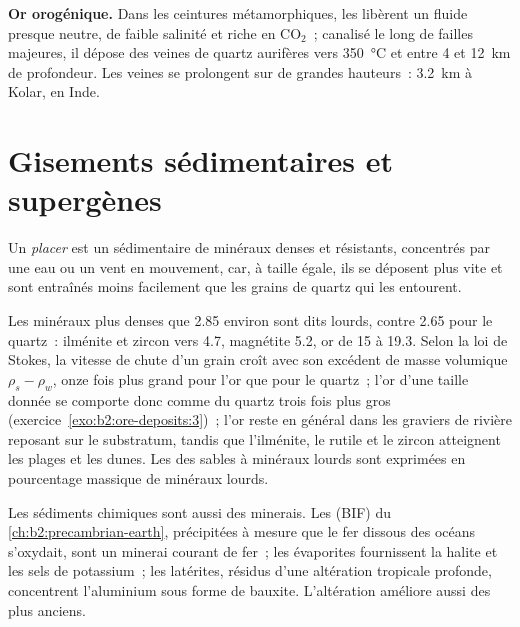 \textbf{Or orogénique.} Dans les ceintures métamorphiques, les  libèrent
un fluide presque neutre, de faible salinité et riche en CO$_2$~; canalisé le long de failles majeures,
il dépose des veines de quartz aurifères vers \qty{350}{\celsius} et entre 4 et \qty{12}{km}
de profondeur. Les veines se prolongent sur de grandes hauteurs~: \qty{3.2}{km} à Kolar, en Inde.

\section{Gisements sédimentaires et supergènes}\label{sec:b2:ore-deposits:sedimentary}

\begin{definition}[Placer]\label{def:b2:ore-deposits:placer}
Un \emph{placer} est un  sédimentaire de minéraux denses et résistants,
concentrés par une eau ou un vent en mouvement, car, à taille égale, ils se déposent
plus vite et sont entraînés moins facilement que les grains de quartz qui les entourent.
\end{definition}

Les minéraux plus denses que 2.85 environ sont dits lourds, contre 2.65 pour le quartz~: ilménite et zircon vers 4.7,
magnétite 5.2, or de 15 à 19.3. Selon la loi de Stokes, la vitesse de chute d'un grain croît avec son excédent de masse
volumique $\rho_s - \rho_w$, onze fois plus grand pour l'or que pour le quartz~; l'or d'une taille donnée se comporte
donc comme du quartz trois fois plus gros (exercice~\ref{exo:b2:ore-deposits:3})~; l'or reste en général dans les
graviers de rivière reposant sur le substratum, tandis que l'ilménite, le rutile et le zircon atteignent les plages
et les dunes. Les  des sables à minéraux lourds sont exprimées en pourcentage massique de minéraux lourds.

Les sédiments chimiques sont aussi des minerais. Les  (BIF) du \cref{ch:b2:precambrian-earth},
précipitées à mesure que le fer dissous des océans s'oxydait, sont un minerai courant de fer~; les évaporites
fournissent la halite et les sels de potassium~; les latérites, résidus d'une altération tropicale profonde,
concentrent l'aluminium sous forme de bauxite. L'altération améliore aussi des  plus anciens.

